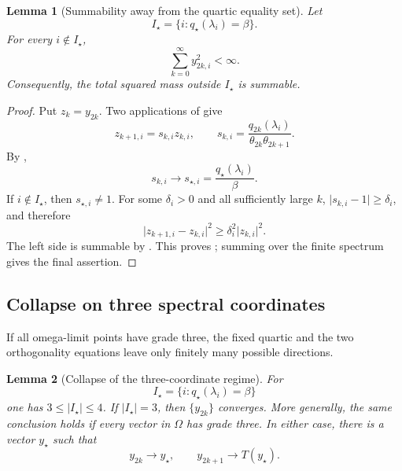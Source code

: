 \documentclass[11pt]{article}
\newtheorem{lemma}{Lemma}[section]
\begin{document}
\begin{lemma}[Summability away from the quartic equality set]
\label{lem:off-support-summability}
Let
\[
 I_\star=\{i:q_\star(\lambda_i)=\beta\}.
\]
For every \(i\notin I_\star\),
\[
 \sum_{k=0}^{\infty}y_{2k,i}^2<\infty.
\tag{10}\label{eq:off-support-summability}
\]
Consequently, the total squared mass outside \(I_\star\) is summable.
\end{lemma}

\begin{proof}
Put \(z_k=y_{2k}\).  Two applications of  give
\[
 z_{k+1,i}=s_{k,i}z_{k,i},\qquad
 s_{k,i}=
 \frac{q_{2k}(\lambda_i)}{\theta_{2k}\theta_{2k+1}}.
\]
By ,
\[
 s_{k,i}\longrightarrow
 s_{\star,i}=\frac{q_\star(\lambda_i)}{\beta}.
\]
If \(i\notin I_\star\), then \(s_{\star,i}\neq1\).  For some
\(\delta_i>0\) and all sufficiently large \(k\),
\(\lvert s_{k,i}-1\rvert\geq\delta_i\), and therefore
\[
 \lvert z_{k+1,i}-z_{k,i}\rvert^2
 \geq\delta_i^2\lvert z_{k,i}\rvert^2.
\]
The left side is summable by .  This proves
; summing over the finite spectrum gives
the final assertion.
\end{proof}

\subsection{Collapse on three spectral coordinates}

If all omega-limit points have grade three, the fixed quartic and the two
orthogonality equations leave only finitely many possible directions.

\begin{lemma}[Collapse of the three-coordinate regime]
\label{lem:three-point-collapse}
For
\[
 I_\star=\{i:q_\star(\lambda_i)=\beta\}
\]
one has \(3\leq\lvert I_\star\rvert\leq4\).  If
\(\lvert I_\star\rvert=3\), then \(\{y_{2k}\}\) converges.  More generally,
the same conclusion holds if every vector in \(\Omega\) has grade three.
In either case, there is a vector \(y_\star\) such that
\[
 y_{2k}\to y_\star,\qquad y_{2k+1}\to T(y_\star).
\]
\end{lemma}
\end{document}
